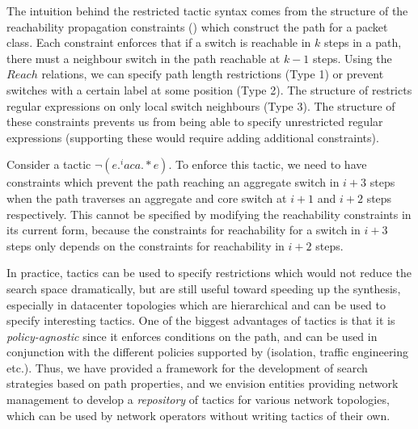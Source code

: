The intuition behind the restricted tactic syntax comes from the structure of the reachability propagation 
constraints () which construct the path for a packet class. 
Each constraint enforces that if a switch is reachable in $k$ steps in a path,
 there must a neighbour switch in the path reachable at $k-1$ steps. 
Using the $Reach$ relations, we can specify path length restrictions (Type 1)
 or prevent switches with a certain label at some position (Type 2). 
 The structure of  restricts regular expressions on only local switch
 neighbours (Type 3).
  The structure of these constraints 
  prevents us from being able to specify unrestricted regular expressions (supporting
  these would require adding additional constraints).
  \begin{example}
  Consider a tactic $\neg(e .^i a c a .*e)$. To enforce
  this tactic, we need to have constraints which prevent the path reaching an aggregate switch in $i+3$
  steps when the path traverses an aggregate and core switch at $i+1$ and $i+2$ steps
  respectively. This cannot be specified by modifying the reachability 
  constraints in its current form, 
  because the constraints for reachability for a switch in $i + 3$ steps only depends on 
  the constraints for reachability in $i+2$ steps. 
   \end{example}

 In practice, tactics can be used to specify restrictions which would not reduce the search space dramatically, 
but are still useful toward speeding up the synthesis, especially in datacenter topologies which are hierarchical 
 and can be used to specify interesting tactics. One of the biggest advantages
 of tactics is that it is \emph{policy-agnostic} since it enforces conditions on the path, and
 can be used in conjunction with the different policies supported by \name (isolation, traffic engineering etc.).  
 Thus, we have provided a framework for the
 development of search strategies based on path properties, and we envision entities providing network
 management to develop a \emph{repository} of tactics for various network topologies, 
 which can be used by network operators without writing tactics of their own. 

